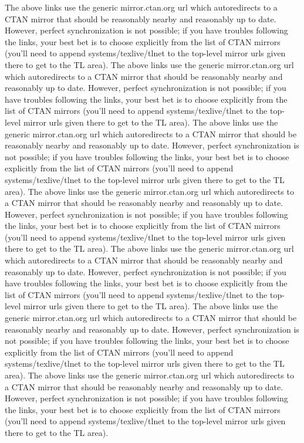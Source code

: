 \documentclass[ngerman]{scrreprt}
\begin{document}
The above links use the generic mirror.ctan.org url which autoredirects to a CTAN mirror that should be reasonably nearby and reasonably up to date. However, perfect synchronization is not possible; if you have troubles following the links, your best bet is to choose explicitly from the list of CTAN mirrors (you'll need to append systems/texlive/tlnet to the top-level mirror urls given there to get to the TL area). The above links use the generic mirror.ctan.org url which autoredirects to a CTAN mirror that should be reasonably nearby and reasonably up to date. However, perfect synchronization is not possible; if you have troubles following the links, your best bet is to choose explicitly from the list of CTAN mirrors (you'll need to append systems/texlive/tlnet to the top-level mirror urls given there to get to the TL area). The above links use the generic mirror.ctan.org url which autoredirects to a CTAN mirror that should be reasonably nearby and reasonably up to date. However, perfect synchronization is not possible; if you have troubles following the links, your best bet is to choose explicitly from the list of CTAN mirrors (you'll need to append systems/texlive/tlnet to the top-level mirror urls given there to get to the TL area). The above links use the generic mirror.ctan.org url which autoredirects to a CTAN mirror that should be reasonably nearby and reasonably up to date. However, perfect synchronization is not possible; if you have troubles following the links, your best bet is to choose explicitly from the list of CTAN mirrors (you'll need to append systems/texlive/tlnet to the top-level mirror urls given there to get to the TL area). The above links use the generic mirror.ctan.org url which autoredirects to a CTAN mirror that should be reasonably nearby and reasonably up to date. However, perfect synchronization is not possible; if you have troubles following the links, your best bet is to choose explicitly from the list of CTAN mirrors (you'll need to append systems/texlive/tlnet to the top-level mirror urls given there to get to the TL area). The above links use the generic mirror.ctan.org url which autoredirects to a CTAN mirror that should be reasonably nearby and reasonably up to date. However, perfect synchronization is not possible; if you have troubles following the links, your best bet is to choose explicitly from the list of CTAN mirrors (you'll need to append systems/texlive/tlnet to the top-level mirror urls given there to get to the TL area). The above links use the generic mirror.ctan.org url which autoredirects to a CTAN mirror that should be reasonably nearby and reasonably up to date. However, perfect synchronization is not possible; if you have troubles following the links, your best bet is to choose explicitly from the list of CTAN mirrors (you'll need to append systems/texlive/tlnet to the top-level mirror urls given there to get to the TL area). 
\end{document}
